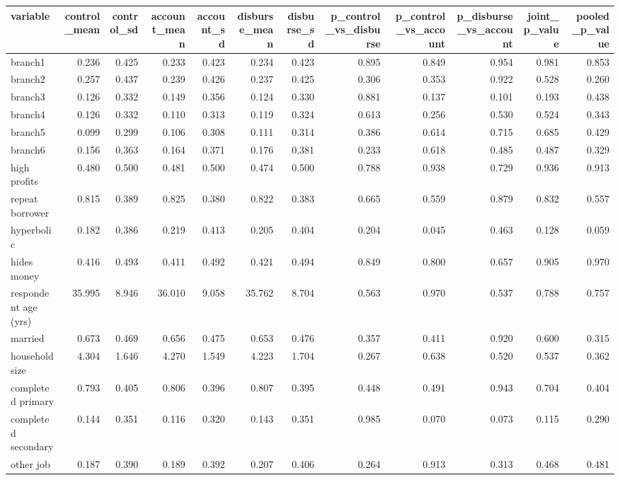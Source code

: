
\begin{tabular}{lrrrrrrrrrrr}
\toprule
variable & control\_mean & control\_sd & account\_mean & account\_sd & disburse\_mean & disburse\_sd & p\_control\_vs\_disburse & p\_control\_vs\_account & p\_disburse\_vs\_account & joint\_p\_value & pooled\_p\_value\\
\midrule
branch1 & 0.236 & 0.425 & 0.233 & 0.423 & 0.234 & 0.423 & 0.895 & 0.849 & 0.954 & 0.981 & 0.853\\
branch2 & 0.257 & 0.437 & 0.239 & 0.426 & 0.237 & 0.425 & 0.306 & 0.353 & 0.922 & 0.528 & 0.260\\
branch3 & 0.126 & 0.332 & 0.149 & 0.356 & 0.124 & 0.330 & 0.881 & 0.137 & 0.101 & 0.193 & 0.438\\
branch4 & 0.126 & 0.332 & 0.110 & 0.313 & 0.119 & 0.324 & 0.613 & 0.256 & 0.530 & 0.524 & 0.343\\
branch5 & 0.099 & 0.299 & 0.106 & 0.308 & 0.111 & 0.314 & 0.386 & 0.614 & 0.715 & 0.685 & 0.429\\
\addlinespace
branch6 & 0.156 & 0.363 & 0.164 & 0.371 & 0.176 & 0.381 & 0.233 & 0.618 & 0.485 & 0.487 & 0.329\\
high profits & 0.480 & 0.500 & 0.481 & 0.500 & 0.474 & 0.500 & 0.788 & 0.938 & 0.729 & 0.936 & 0.913\\
repeat borrower & 0.815 & 0.389 & 0.825 & 0.380 & 0.822 & 0.383 & 0.665 & 0.559 & 0.879 & 0.832 & 0.557\\
hyperbolic & 0.182 & 0.386 & 0.219 & 0.413 & 0.205 & 0.404 & 0.204 & 0.045 & 0.463 & 0.128 & 0.059\\
hides money & 0.416 & 0.493 & 0.411 & 0.492 & 0.421 & 0.494 & 0.849 & 0.800 & 0.657 & 0.905 & 0.970\\
\addlinespace
respondent age (yrs) & 35.995 & 8.946 & 36.010 & 9.058 & 35.762 & 8.704 & 0.563 & 0.970 & 0.537 & 0.788 & 0.757\\
married & 0.673 & 0.469 & 0.656 & 0.475 & 0.653 & 0.476 & 0.357 & 0.411 & 0.920 & 0.600 & 0.315\\
household size & 4.304 & 1.646 & 4.270 & 1.549 & 4.223 & 1.704 & 0.267 & 0.638 & 0.520 & 0.537 & 0.362\\
completed primary & 0.793 & 0.405 & 0.806 & 0.396 & 0.807 & 0.395 & 0.448 & 0.491 & 0.943 & 0.704 & 0.404\\
completed secondary & 0.144 & 0.351 & 0.116 & 0.320 & 0.143 & 0.351 & 0.985 & 0.070 & 0.073 & 0.115 & 0.290\\
\addlinespace
other job & 0.187 & 0.390 & 0.189 & 0.392 & 0.207 & 0.406 & 0.264 & 0.913 & 0.313 & 0.468 & 0.481\\

\end{tabular}
